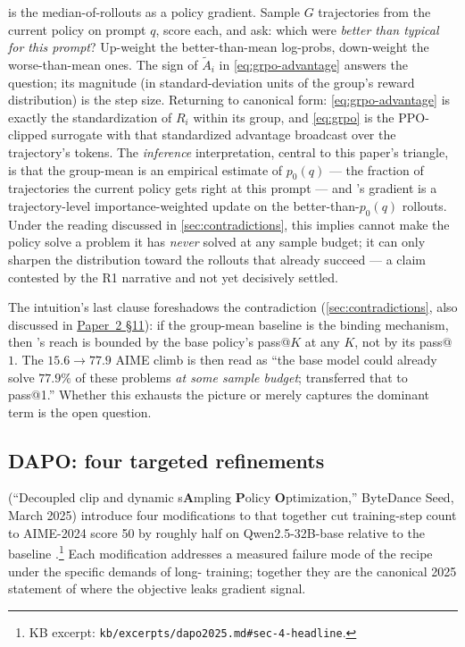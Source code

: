 \begin{intuition}
 is the median-of-rollouts as a policy gradient. Sample $G$
trajectories from the current policy on prompt $q$, score each, and
ask: which were \emph{better than typical for this prompt}? Up-weight
the better-than-mean log-probs, down-weight the worse-than-mean ones.
The sign of $\tilde{A}_i$ in \cref{eq:grpo-advantage} answers the
question; its magnitude (in standard-deviation units of the group's
reward distribution) is the step size. Returning to canonical form:
\cref{eq:grpo-advantage} is exactly the standardization of $R_i$ within
its group, and \cref{eq:grpo} is the PPO-clipped surrogate with that
standardized advantage broadcast over the trajectory's tokens. The
\emph{inference} interpretation, central to this paper's triangle, is
that the group-mean is an empirical estimate of $p_0(q)$ --- the
fraction of trajectories the current policy gets right at this prompt
--- and 's gradient is a trajectory-level importance-weighted
update on the better-than-$p_0(q)$ rollouts. Under the
\citet{rlvr-limits-2025} reading discussed in
\cref{sec:contradictions}, this implies  cannot make the policy
solve a problem it has \emph{never} solved at any sample budget; it
can only sharpen the distribution toward the rollouts that already
succeed --- a claim contested by the R1 narrative \citep[\S
2.3]{deepseek-r1} and not yet decisively settled.
\end{intuition}

The intuition's last clause foreshadows the
\citet{rlvr-limits-2025} contradiction (\cref{sec:contradictions}, also
discussed in \hyperref[P2-sec:rlvr-grpo]{Paper~2 §11}): if the group-mean baseline is the binding
mechanism, then 's reach is bounded by the base policy's pass@$K$
at any $K$, not by its pass@$1$. The $15.6 \to 77.9$ AIME climb is then
read as ``the base model could already solve $77.9\%$ of these problems
\emph{at some sample budget};  transferred that to pass@1.''
Whether this exhausts the picture or merely captures the dominant term
is the open question.

\subsection{DAPO: four targeted refinements}
\label{sec:rlvr-dapo}

\citet{dapo2025} (``Decoupled clip and dynamic s\textbf{A}mpling
\textbf{P}olicy \textbf{O}ptimization,'' ByteDance Seed, March 2025)
introduce four modifications to  that together cut training-step
count to AIME-2024 score 50 by roughly half on Qwen2.5-32B-base
relative to the  baseline \citep[\S
4]{dapo2025}.\footnote{KB excerpt:
\nolinkurl{kb/excerpts/dapo2025.md#sec-4-headline}.} Each modification
addresses a measured failure mode of the  recipe under the
specific demands of long- training; together they are the canonical
2025 statement of where the  objective leaks gradient signal.

